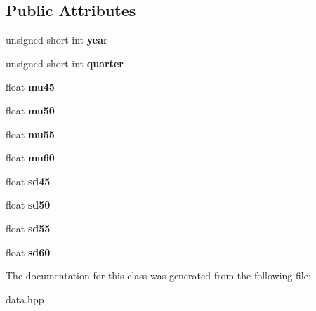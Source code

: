 \subsection*{Public Attributes}
\begin{DoxyCompactItemize}
\item 
\hypertarget{classIOSKJ_1_1Data_1_1ZEstimate_a2511cde8860fc325a4be66a05d806b94}{unsigned short int {\bfseries year}}\label{classIOSKJ_1_1Data_1_1ZEstimate_a2511cde8860fc325a4be66a05d806b94}

\item 
\hypertarget{classIOSKJ_1_1Data_1_1ZEstimate_abc1f796aef34133f4dad711ace3dd529}{unsigned short int {\bfseries quarter}}\label{classIOSKJ_1_1Data_1_1ZEstimate_abc1f796aef34133f4dad711ace3dd529}

\item 
\hypertarget{classIOSKJ_1_1Data_1_1ZEstimate_ab3cf8c05dd916758fcc22c8676473182}{float {\bfseries mu45}}\label{classIOSKJ_1_1Data_1_1ZEstimate_ab3cf8c05dd916758fcc22c8676473182}

\item 
\hypertarget{classIOSKJ_1_1Data_1_1ZEstimate_a49b0106bd644e434504ce8c677bf5d5b}{float {\bfseries mu50}}\label{classIOSKJ_1_1Data_1_1ZEstimate_a49b0106bd644e434504ce8c677bf5d5b}

\item 
\hypertarget{classIOSKJ_1_1Data_1_1ZEstimate_a7728fcde3967717cb8342ca0b0550f5d}{float {\bfseries mu55}}\label{classIOSKJ_1_1Data_1_1ZEstimate_a7728fcde3967717cb8342ca0b0550f5d}

\item 
\hypertarget{classIOSKJ_1_1Data_1_1ZEstimate_af2cdea31b63889b691238a92bca3ce10}{float {\bfseries mu60}}\label{classIOSKJ_1_1Data_1_1ZEstimate_af2cdea31b63889b691238a92bca3ce10}

\item 
\hypertarget{classIOSKJ_1_1Data_1_1ZEstimate_ac6bf29ae6cc8e5b69d21c774b5143937}{float {\bfseries sd45}}\label{classIOSKJ_1_1Data_1_1ZEstimate_ac6bf29ae6cc8e5b69d21c774b5143937}

\item 
\hypertarget{classIOSKJ_1_1Data_1_1ZEstimate_ac04b382296b2422a61d6c6e6ceb28d84}{float {\bfseries sd50}}\label{classIOSKJ_1_1Data_1_1ZEstimate_ac04b382296b2422a61d6c6e6ceb28d84}

\item 
\hypertarget{classIOSKJ_1_1Data_1_1ZEstimate_af38b9264f644528589e2fe18750177b6}{float {\bfseries sd55}}\label{classIOSKJ_1_1Data_1_1ZEstimate_af38b9264f644528589e2fe18750177b6}

\item 
\hypertarget{classIOSKJ_1_1Data_1_1ZEstimate_a19e5b287fb0fa792569a2062c2e63e2b}{float {\bfseries sd60}}\label{classIOSKJ_1_1Data_1_1ZEstimate_a19e5b287fb0fa792569a2062c2e63e2b}

\end{DoxyCompactItemize}


The documentation for this class was generated from the following file\-:\begin{DoxyCompactItemize}
\item 
data.\-hpp\end{DoxyCompactItemize}

